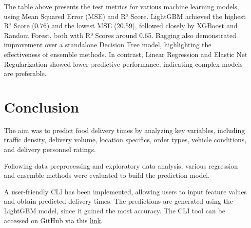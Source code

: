 \documentclass[10pt,twocolumn,letterpaper]{article}
\begin{document}
    The table above presents the test metrics for various machine learning models, using Mean Squared Error (MSE) and R² Score. LightGBM achieved the highest R² Score (0.76) and the lowest MSE (20.59), followed closely by XGBoost and Random Forest, both with R² Scores around 0.65. Bagging also demonstrated improvement over a standalone Decision Tree model, highlighting the effectiveness of ensemble methods. In contrast, Linear Regression and Elastic Net Regularization showed lower predictive performance, indicating complex models are preferable.

\section{Conclusion}
    The aim was to predict food delivery times by analyzing key variables, including traffic density, delivery volume, location specifics, order types, vehicle conditions, and delivery personnel ratings.

    Following data preprocessing and exploratory data analysis, various regression and ensemble methods were evaluated to build the prediction model.

    A user-friendly CLI has been implemented, allowing users to input feature values and obtain predicted delivery times. The predictions are generated using the LightGBM model, since it gained the most accuracy. The CLI tool can be accessed on GitHub via this \href{https://github.com/Vikranth3140/Food-Delivery-Time-Prediction/blob/main/main.py}{link}.

\newpage
\end{document}
